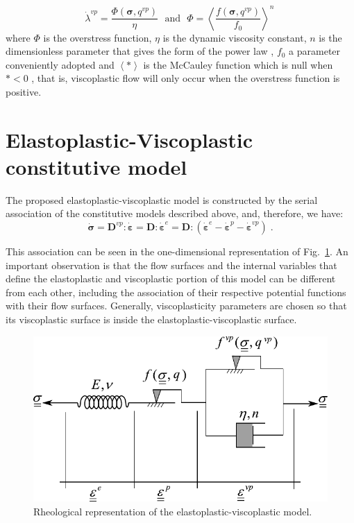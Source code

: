 \documentclass[Journal,letterpaper]{ascelike-new}
\newcommand{\Dsdee}{\boldsymbol{D}}
\newcommand{\Dsdev}{\boldsymbol{D}^{vp}}
\newcommand{\dstraine}{\boldsymbol{\dot{\varepsilon}}^{e}}
\newcommand{\dstrainp}{\boldsymbol{\dot{\varepsilon}}^{p}}
\newcommand{\dstrainv}{\boldsymbol{\dot{\varepsilon}}^{vp}}
\newcommand{\dstrain}{\boldsymbol{\dot{\varepsilon}}}
\newcommand{\dstress}{\boldsymbol{\dot{\sigma}}}
\newcommand{\stress}{\boldsymbol{\sigma}}
\begin{document}
\begin{equation} \label{eq_perzyna_model}
	\dot \lambda^{vp} = \dfrac{\Phi(\stress,q^{vp})}{\eta}~~~\text{and}~~~\Phi = \left\langle  \dfrac{f(\stress,q^{vp})}{f_0} \right\rangle^n \,
\end{equation} where $\Phi$ is the overstress function, $\eta$ is the dynamic viscosity constant, $n$ is the dimensionless parameter that gives the form of the power law , $f_0$ a parameter conveniently adopted and $\left\langle * \right\rangle$ is the McCauley function which is null when $* <0$ , that is, viscoplastic flow will only occur when the overstress function is positive.

\section{Elastoplastic-Viscoplastic constitutive model}

The proposed elastoplastic-viscoplastic model is constructed by the serial association of the constitutive models described above, and, therefore, we have:
\begin{equation} \label{eq_constitutive_relationship_epvp}
	\dstress = \Dsdev : \dstrain = \Dsdee : \dstraine = \Dsdee : (\dstraine - \dstrainp - \dstrainv)\;.
\end{equation}

This association can be seen in the one-dimensional representation of Fig.~\ref{reological_scheme}. An important observation is that the flow surfaces and the internal variables that define the elastoplastic and viscoplastic portion of this model can be different from each other, including the association of their respective potential functions with their flow surfaces. Generally, viscoplasticity parameters are chosen so that its viscoplastic surface is inside the elastoplastic-viscoplastic surface.

\begin{figure}
	\centering
	\includegraphics[scale=1]{reological_scheme.pdf}
	\caption{Rheological representation of the elastoplastic-viscoplastic model.}
	\label{reological_scheme}
\end{figure}
\end{document}

